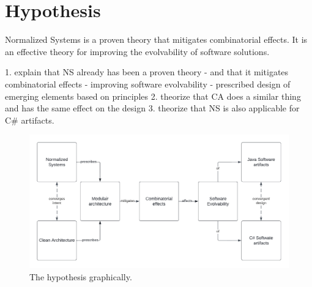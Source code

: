 \section{Hypothesis} \label{hypothesis}
Normalized Systems is a proven theory \cite*[]{mannaert_normalized_2009} that mitigates
combinatorial effects. It is an effective theory for improving the evolvability
of software solutions.


1. explain that NS already has been a proven theory
    - and that it mitigates combinatorial effects
    - improving software evolvability
    - prescribed design of emerging elements based on principles
2. theorize that CA does a similar thing and has the same effect on the design
3. theorize that NS is also applicable for C\# artifacts.

\begin{figure}[!h]
    \centering
    \includegraphics[width=1\textwidth]{Figures/hypothesis.pdf}
    \caption[The hypothesis graphically.]{The hypothesis graphically.}
    \label{fig:hypothesis}
\end{figure}